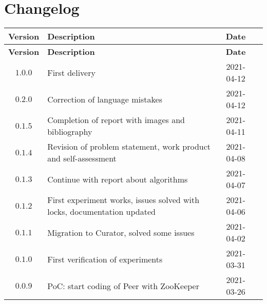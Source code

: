\section*{Changelog}

\begin{longtable}{@{}cp{}cc@{}}
    \toprule

    \textbf{Version} & \textbf{Description} & \textbf{Date} \\\midrule

    \endfirsthead

    \toprule

    \textbf{Version} & \textbf{Description} & \textbf{Date} \\\midrule

    \endhead

    $1.0.0$ & First delivery & 2021-04-12    \\

    \midrule

    $0.2.0$ & Correction of language mistakes & 2021-04-12    \\

    \midrule

    $0.1.5$ & Completion of report with images and bibliography & 2021-04-11    \\

    \midrule

    $0.1.4$ & Revision of problem statement, work product and self-assessment & 2021-04-08    \\

    \midrule

    $0.1.3$ & Continue with report about algorithms & 2021-04-07    \\

    \midrule

    $0.1.2$ & First experiment works, issues solved with locks, documentation updated & 2021-04-06    \\

    \midrule

    $0.1.1$ & Migration to Curator, solved some issues & 2021-04-02    \\

    \midrule

    $0.1.0$ & First verification of experiments & 2021-03-31    \\

    \midrule

    $0.0.9$ & PoC: start coding of Peer with ZooKeeper & 2021-03-26    \\


\end{longtable}
